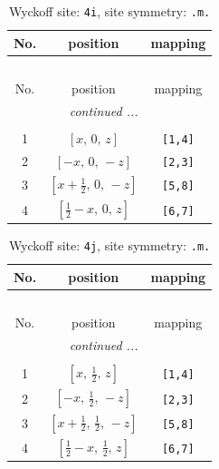 \documentclass[fleqn,8pt]{jsarticle}
\begin{document}
\renewcommand{\arraystretch}{1.2}
\begin{longtable}{ccc}
\caption{Wyckoff site: {\tt 4i}, site symmetry: {\tt .m.}}
 \\
 \hline \hline
No. & position & mapping \\ \hline \endfirsthead

\multicolumn{2}{l}{\tablename\ \thetable{}} \\
 \hline \hline
No. & position & mapping \\ \hline \endhead

 \hline \hline
\multicolumn{2}{r}{\footnotesize\it continued ...} \\ \endfoot

 \hline \hline
\multicolumn{2}{r}{} \\ \endlastfoot

1 & $\left[ x,\, 0,\, z \right]$ & {\tt [1,4]} \\ \hline
2 & $\left[ - x,\, 0,\, - z \right]$ & {\tt [2,3]} \\ \hline
3 & $\left[ x + \frac{1}{2},\, 0,\, - z \right]$ & {\tt [5,8]} \\ \hline
4 & $\left[ \frac{1}{2} - x,\, 0,\, z \right]$ & {\tt [6,7]} \\
\end{longtable}
\renewcommand{\arraystretch}{1.2}
\begin{longtable}{ccc}
\caption{Wyckoff site: {\tt 4j}, site symmetry: {\tt .m.}}
 \\
 \hline \hline
No. & position & mapping \\ \hline \endfirsthead

\multicolumn{2}{l}{\tablename\ \thetable{}} \\
 \hline \hline
No. & position & mapping \\ \hline \endhead

 \hline \hline
\multicolumn{2}{r}{\footnotesize\it continued ...} \\ \endfoot

 \hline \hline
\multicolumn{2}{r}{} \\ \endlastfoot

1 & $\left[ x,\, \frac{1}{2},\, z \right]$ & {\tt [1,4]} \\ \hline
2 & $\left[ - x,\, \frac{1}{2},\, - z \right]$ & {\tt [2,3]} \\ \hline
3 & $\left[ x + \frac{1}{2},\, \frac{1}{2},\, - z \right]$ & {\tt [5,8]} \\ \hline
4 & $\left[ \frac{1}{2} - x,\, \frac{1}{2},\, z \right]$ & {\tt [6,7]} \\
\end{longtable}
\end{document}
